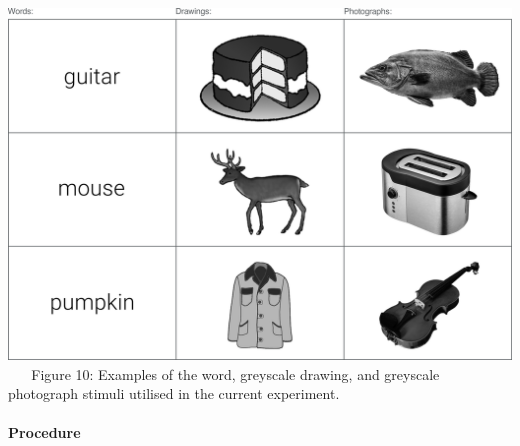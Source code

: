 \documentclass[
  11pt,
]{article}
\begin{document}
~ ~

\includegraphics[width=1\linewidth]{./resources/images/exp3__stim_examples}
~ ~ Figure 10: Examples of the word, greyscale drawing, and greyscale
photograph stimuli utilised in the current experiment. ~ ~

\hypertarget{procedure-2}{%
\paragraph{Procedure}\label{procedure-2}}
\end{document}
